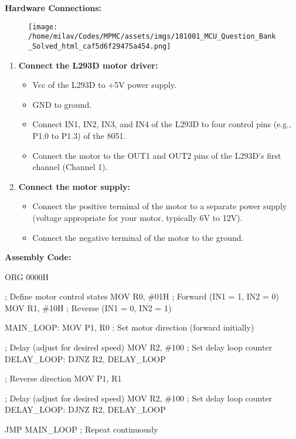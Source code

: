 \documentclass[
]{article}
\newenvironment{Shaded}{}{}
\newcommand{\NormalTok}[1]{#1}
\begin{document}
\textbf{Hardware Connections:}

\begin{figure}
\centering
\texttt{[image: /home/milav/Codes/MPMC/assets/imgs/181001\_MCU\_Question\_Bank\_Solved\_html\_caf5d6f29475a454.png]}
\caption{}
\end{figure}

\begin{enumerate}
\def\labelenumi{\arabic{enumi}.}
\item
  \textbf{Connect the L293D motor driver:}

  \begin{itemize}
  \item
    Vcc of the L293D to +5V power supply.
  \item
    GND to ground.
  \item
    Connect IN1, IN2, IN3, and IN4 of the L293D to four control pins
    (e.g., P1.0 to P1.3) of the 8051.
  \item
    Connect the motor to the OUT1 and OUT2 pins of the L293D's first
    channel (Channel 1).
  \end{itemize}
\item
  \textbf{Connect the motor supply:}

  \begin{itemize}
  \item
    Connect the positive terminal of the motor to a separate power
    supply (voltage appropriate for your motor, typically 6V to 12V).
  \item
    Connect the negative terminal of the motor to the ground.
  \end{itemize}
\end{enumerate}

\textbf{Assembly Code:}

\begin{Shaded}
\begin{Highlighting}[]
\NormalTok{ORG 0000H}

\NormalTok{; Define motor control states}
\NormalTok{MOV R0, \#01H ; Forward (IN1 = 1, IN2 = 0)}
\NormalTok{MOV R1, \#10H ; Reverse (IN1 = 0, IN2 = 1)}

\NormalTok{MAIN\_LOOP:}
\NormalTok{    MOV P1, R0     ; Set motor direction (forward initially)}

\NormalTok{    ; Delay (adjust for desired speed)}
\NormalTok{    MOV R2, \#100  ; Set delay loop counter}
\NormalTok{    DELAY\_LOOP:}
\NormalTok{        DJNZ R2, DELAY\_LOOP}

\NormalTok{    ; Reverse direction}
\NormalTok{    MOV P1, R1}

\NormalTok{    ; Delay (adjust for desired speed)}
\NormalTok{    MOV R2, \#100  ; Set delay loop counter}
\NormalTok{    DELAY\_LOOP:}
\NormalTok{        DJNZ R2, DELAY\_LOOP}

\NormalTok{    JMP MAIN\_LOOP  ; Repeat continuously}
\end{Highlighting}
\end{Shaded}
\end{document}
